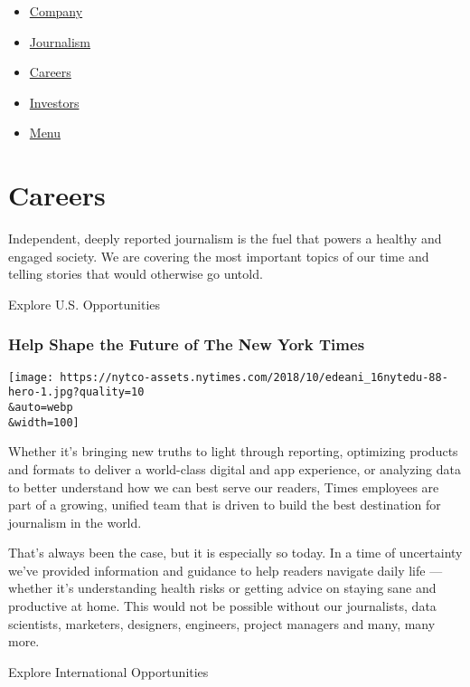 \begin{itemize}
\tightlist
\item
  \href{https://www.nytco.com/company/}{Company}
\item
  \href{https://www.nytco.com/journalism/}{Journalism}
\item
  \href{https://www.nytco.com/careers/}{Careers}
\item
  \href{https://www.nytco.com/investors/investor-relations/}{Investors}
\item
  \protect\hyperlink{}{Menu}
\end{itemize}

\hypertarget{careers}{%
\section{Careers}\label{careers}}

Independent, deeply reported journalism is the fuel that powers a
healthy and engaged society. We are covering the most important topics
of our time and telling stories that would otherwise go untold.

Explore U.S. Opportunities

\hypertarget{help-shape-the-future-of-the-new-york-times}{%
\subsubsection{Help Shape the Future of The New York
Times}\label{help-shape-the-future-of-the-new-york-times}}

\texttt{[image: https://nytco-assets.nytimes.com/2018/10/edeani\_16nytedu-88-hero-1.jpg?quality=10\\\&auto=webp\\\&width=100]}

Whether it's bringing new truths to light through reporting, optimizing
products and formats to deliver a world-class digital and app
experience, or analyzing data to better understand how we can best serve
our readers, Times employees are part of a growing, unified team that is
driven to build the best destination for journalism in the world.

That's always been the case, but it is especially so today. In a time of
uncertainty we've provided information and guidance to help readers
navigate daily life --- whether it's understanding health risks or
getting advice on staying sane and productive at home. This would not be
possible without our journalists, data scientists, marketers, designers,
engineers, project managers and many, many more.

Explore International Opportunities

